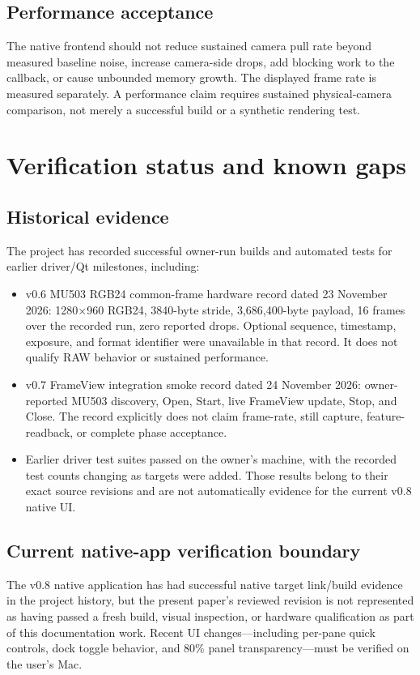 \documentclass[11pt,a4paper,oneside]{article}
\begin{document}
\subsection{Performance acceptance}
The native frontend should not reduce sustained camera pull rate beyond measured baseline noise, increase camera-side drops, add blocking work to the callback, or cause unbounded memory growth. The displayed frame rate is measured separately. A performance claim requires sustained physical-camera comparison, not merely a successful build or a synthetic rendering test.

\section{Verification status and known gaps}

\subsection{Historical evidence}
The project has recorded successful owner-run builds and automated tests for earlier driver/Qt milestones, including:
\begin{itemize}
  \item v0.6 MU503 RGB24 common-frame hardware record dated 23 November 2026: 1280$\times$960 RGB24, 3840-byte stride, 3,686,400-byte payload, 16 frames over the recorded run, zero reported drops. Optional sequence, timestamp, exposure, and format identifier were unavailable in that record. It does not qualify RAW behavior or sustained performance.
  \item v0.7 FrameView integration smoke record dated 24 November 2026: owner-reported MU503 discovery, Open, Start, live FrameView update, Stop, and Close. The record explicitly does not claim frame-rate, still capture, feature-readback, or complete phase acceptance.
  \item Earlier driver test suites passed on the owner's machine, with the recorded test counts changing as targets were added. Those results belong to their exact source revisions and are not automatically evidence for the current v0.8 native UI.
\end{itemize}

\subsection{Current native-app verification boundary}
The v0.8 native application has had successful native target link/build evidence in the project history, but the present paper's reviewed revision is not represented as having passed a fresh build, visual inspection, or hardware qualification as part of this documentation work. Recent UI changes—including per-pane quick controls, dock toggle behavior, and 80\% panel transparency—must be verified on the user's Mac.
\end{document}
